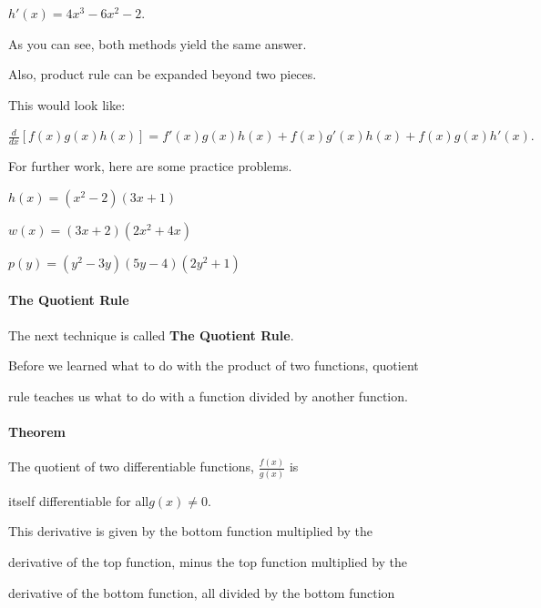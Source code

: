 {{{{$h'(x) = 4x^3 - 6x^2 - 2.$



As you can see, both methods yield the same answer.



Also, product rule can be expanded beyond two pieces.



This would look like:



$\frac{d}{dx}[f(x)g(x)h(x)] = f'(x)g(x)h(x) + f(x)g'(x)h(x) + f(x)g(x)h'(x).$



For further work, here are some practice problems.



$h(x) = (x^2-2)(3x+1)$



$w(x) = (3x + 2)(2x^2 +4x)$



$p(y) = (y^2 -3y)(5y-4)(2y^2 + 1)$



\paragraph{The Quotient Rule}



The next technique is called \textbf{The Quotient Rule}.



Before we learned what to do with the product of two functions, quotient

rule teaches us what to do with a function divided by another function.



\paragraph{Theorem}



The quotient of two differentiable functions, $\frac {f(x)}{g(x)}$ is

itself differentiable for all$g(x) \ne 0.$



This derivative is given by the bottom function multiplied by the

derivative of the top function, minus the top function multiplied by the

derivative of the bottom function, all divided by the bottom function

}}}}
